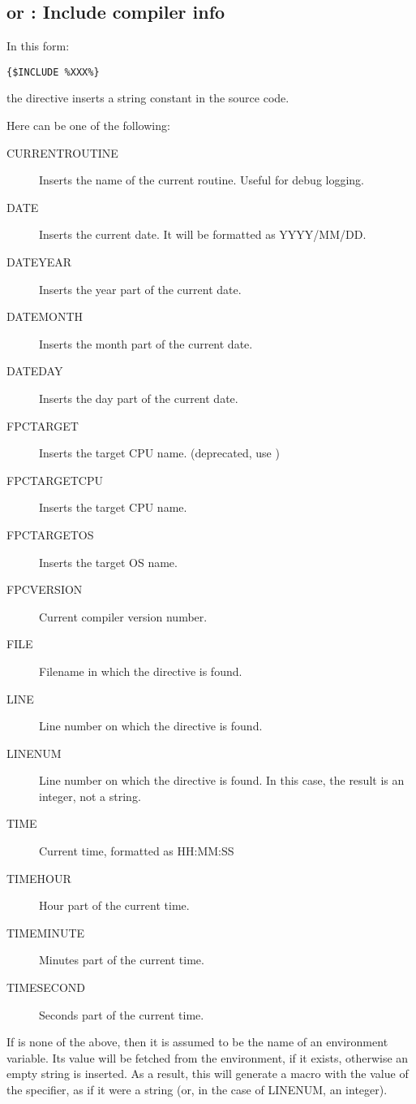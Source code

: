 \subsection{ or  : Include compiler info}
In this form:
\begin{verbatim}
{$INCLUDE %XXX%}
\end{verbatim}
the  directive inserts a string constant in the source
code. 

Here  can be one of the following:
\begin{description}
\item[CURRENTROUTINE] Inserts the name of the current routine. Useful for debug logging.
\item[DATE] Inserts the current date. It will be formatted as YYYY/MM/DD.
\item[DATEYEAR] Inserts the year part of the current date.
\item[DATEMONTH] Inserts the month part of the current date.
\item[DATEDAY] Inserts the day part of the current date.
\item[FPCTARGET] Inserts the target CPU name. (deprecated, use
)
\item[FPCTARGETCPU] Inserts the target CPU name.
\item[FPCTARGETOS] Inserts the target OS name.
\item[FPCVERSION] Current compiler version number.
\item[FILE] Filename in which the directive is found.
\item[LINE] Line number on which the directive is found.
\item[LINENUM] Line number on which the directive is found. In this case,
the result is an integer, not a string.
\item[TIME] Current time, formatted as HH:MM:SS
\item[TIMEHOUR] Hour part of the current time.
\item[TIMEMINUTE] Minutes part of the current time.
\item[TIMESECOND] Seconds part of the current time.
\end{description}
If  is none of the above, then it is assumed to be the name of
an environment variable. Its value will be fetched from the environment,
if it exists, otherwise an empty string is inserted.
As a result, this will generate a macro with the value of the 
specifier, as if it were a string (or, in the case of LINENUM, an integer).  

